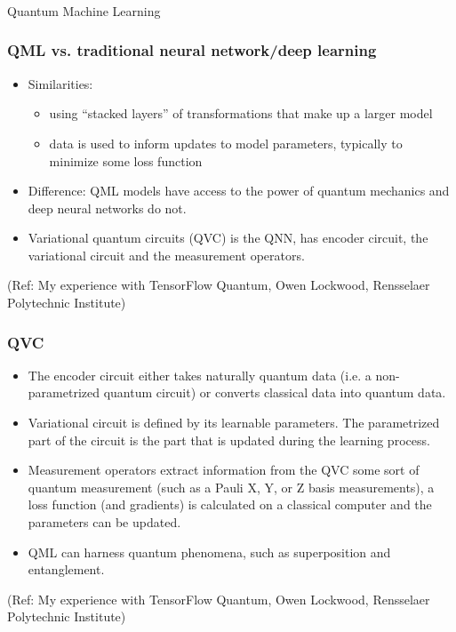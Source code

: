 \begin{frame}[fragile]\frametitle{}
\begin{center}
{\Large Quantum Machine Learning}
\end{center}
\end{frame}

 \begin{frame}[fragile]\frametitle{QML vs. traditional neural network/deep learning}
\begin{itemize}
\item  Similarities:
\begin{itemize}
\item  using “stacked layers” of transformations that make up a larger model
\item  data is used to inform updates to model parameters, typically to minimize some loss function
\end{itemize}

\item  Difference: QML models have access to the power of quantum mechanics and deep neural networks do not.
\item  Variational quantum circuits (QVC) is the QNN, has encoder circuit, the variational circuit and the measurement operators. 

\end{itemize}


\tiny{(Ref: My experience with TensorFlow Quantum,  Owen Lockwood, Rensselaer Polytechnic Institute)}

\end{frame}

 \begin{frame}[fragile]\frametitle{QVC}
\begin{itemize}
\item  The encoder circuit either takes naturally quantum data (i.e. a non-parametrized quantum circuit) or converts classical data into quantum data. 
\item  Variational circuit is defined by its learnable parameters. The parametrized part of the circuit is the part that is updated during the learning process. 
\item  Measurement operators extract information from the QVC some sort of quantum measurement (such as a Pauli X, Y, or Z basis measurements), a loss function (and gradients) is calculated on a classical computer and the parameters can be updated.

\item  QML can harness quantum phenomena, such as superposition and entanglement. 

\end{itemize}

	
\tiny{(Ref: My experience with TensorFlow Quantum,  Owen Lockwood, Rensselaer Polytechnic Institute)}

\end{frame}

